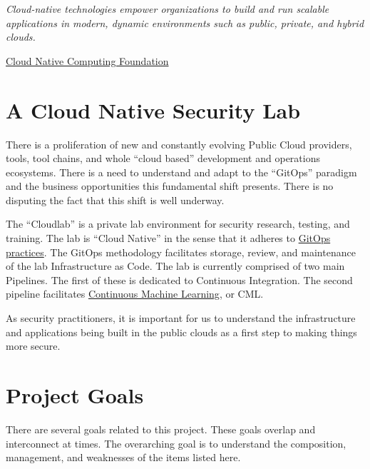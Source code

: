 







\begin{displayquote}
	\emph{Cloud-native technologies empower organizations to build and run scalable applications in modern, dynamic environments such as public,
	private, and hybrid clouds.}
	
	\href{https://www.cncf.io/about/who-we-are/}{Cloud Native Computing Foundation}
\end{displayquote}

\section{\label{sec:Start}A Cloud Native Security Lab}
\vspace{2mm}
\justifying
There is a proliferation of new and constantly evolving Public Cloud providers, tools, tool chains, and whole 
``cloud based'' development and operations ecosystems. There is a need to understand and adapt to the ``GitOps'' paradigm and the
business opportunities this fundamental shift presents. There is no disputing the fact that this shift is well underway\cite{CloudShift}. 

\justifying
The ``Cloudlab'' is a private lab environment for security research, testing, and training. The lab is ``Cloud Native'' in the sense that it
adheres to \href{https://www.cloudbees.com/gitops/what-is-gitops}{GitOps practices}. The GitOps methodology facilitates storage, review, and
maintenance of the lab Infrastructure as Code. The lab is currently comprised of two main Pipelines. The first of these is dedicated to Continuous
Integration. The second pipeline facilitates \href{https://cml.dev/doc}{Continuous Machine Learning}, or CML\cite{books/mit/026233758}.

\justifying
As security practitioners, it is important for us to understand the infrastructure and applications being built in the public clouds as a first 
step to making things more secure.

\section{\label{sec:Project}Project Goals}
\vspace{2mm}
\justifying
There are several goals related to this project. These goals overlap and interconnect at times. The overarching goal is to understand the composition,
management, and weaknesses of the items listed here.

